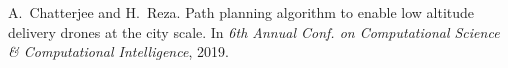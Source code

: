 \begin{Appendix}

    \begin{thebibliography}{1}

        A.~Chatterjee and H.~Reza.
        \newblock Path planning algorithm to enable low altitude delivery drones at the
          city scale.
        \newblock In {\em 6th Annual Conf. on Computational Science \& Computational
          Intelligence}, 2019.
        
    \end{thebibliography}

\end{Appendix}